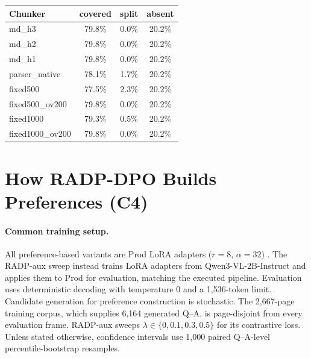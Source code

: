 \documentclass[11pt]{article}
\newcommand{\contribTraining}{C4}
\begin{document}
\begin{center}
\begin{minipage}{\columnwidth}
\centering\small
\captionsetup{hypcap=false}
\begin{tabular}{lccc}
\toprule
Chunker & covered & split & absent \\
\midrule
md\_h3 & 79.8\% & 0.0\% & 20.2\% \\
md\_h2 & 79.8\% & 0.0\% & 20.2\% \\
md\_h1 & 79.8\% & 0.0\% & 20.2\% \\
parser\_native & 78.1\% & 1.7\% & 20.2\% \\
fixed500 & 77.5\% & 2.3\% & 20.2\% \\
fixed500\_ov200 & 79.8\% & 0.0\% & 20.2\% \\
fixed1000 & 79.3\% & 0.5\% & 20.2\% \\
fixed1000\_ov200 & 79.8\% & 0.0\% & 20.2\% \\
\bottomrule
\end{tabular}
\label{tab:coverage}
\end{minipage}
\end{center}

\section{How RADP-DPO Builds Preferences (\contribTraining)}
\label{app:milestones}

\paragraph{Common training setup.} All preference-based variants are Prod LoRA adapters ($r=8$, $\alpha=32$) \citep{hu2021lora}. The RADP-aux sweep instead trains LoRA adapters from Qwen3-VL-2B-Instruct and applies them to Prod for evaluation, matching the executed pipeline. Evaluation uses deterministic decoding with temperature 0 and a 1{,}536-token limit. Candidate generation for preference construction is stochastic. The 2{,}667-page training corpus, which supplies 6{,}164 generated Q--A, is page-disjoint from every evaluation frame. RADP-aux sweeps $\lambda\in\{0,0.1,0.3,0.5\}$ for its contrastive loss. Unless stated otherwise, confidence intervals use 1{,}000 paired Q--A-level percentile-bootstrap resamples.
\end{document}
